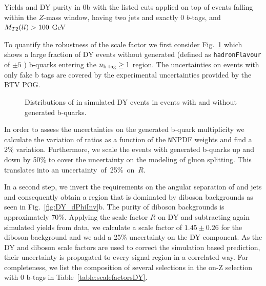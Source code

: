 \begin{table}
\centering

\caption{Yields and DY purity in 0b with the listed cuts applied on top of events falling within the $Z$-mass window, having two jets and exactly 0 $b$-tags, and $M_{T2}(ll) > 100$ GeV}
\label{table:scalefactorsDY}
\end{table}

To quantify the robustness of the scale factor we first consider Fig.~\ref{fig:DY_nbtag} which shows a large fraction of DY events without generated (defined as \texttt{hadronFlavour} of $\pm 5$ \cite{twiki:hadronFlavour}) b-quarks entering the $n_\text{b-tag}\geq 1$ region. 
The uncertainties on events with only fake b tags are covered by the experimental uncertainties provided by the BTV POG. 
\begin{figure}[!hbtp]
\centering
{}
\caption{Distributions of \Nbtags in simulated DY events in events with and without generated b-quarks.}
\label{fig:DY_nbtag}
\end{figure}
In order to assess the uncertainties on the generated b-quark multiplicity we calculate  the variation of ratios as a function of the {\texttt NNPDF} weights and find a 2\% variation. 
Furthermore, we scale the events with generated b-quarks up and down by 50\% to cover the uncertainty on the modeling of gluon splitting. This translates into an uncertainty~of~25\%~on~$R$. 

In a second step, we invert the requirements on the angular separation of \ETmiss and jets and consequently obtain a region that is dominated by diboson backgrounds as seen in Fig.~\ref{fig:DY_dPhiInv}b.
The purity of diboson backgrounds is approximately 70\%. 
Applying the scale factor $R$ on DY and subtracting again simulated yields from data, we calculate a scale factor of $1.45\pm0.26$ for the diboson background and we add a 25\% uncertainty on the DY component. 
As the DY and diboson scale factors are used to correct the simulation based prediction, their uncertainty is propagated to every signal region in a correlated way.
For completeness, we list the composition of several selections in the on-Z selection with 0 b-tags in Table~\ref{table:scalefactorsDY}. 


